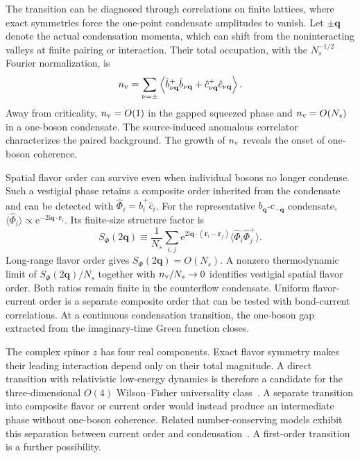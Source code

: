 \documentclass[onecolumn,aps,prb,amsmath,amssymb,superscriptaddress,longbibliography]{revtex4-2}
\newcommand{\ee}{\mathrm{e}}
\newcommand{\ii}{\mathrm{i}}
\begin{document}
The transition can be diagnosed through correlations on finite lattices, where exact symmetries force the one-point condensate amplitudes to vanish.  Let \(\pm\mathbf q\) denote the actual condensation momenta, which can shift from the noninteracting valleys at finite pairing or interaction.  Their total occupation, with the \(N_s^{-1/2}\) Fourier normalization, is
\begin{equation}
    n_{\rm v}=\sum_{\nu=\pm}\left\langle
    \hat b_{\nu\mathbf q}^+\hat b_{\nu\mathbf q}
    +\hat c_{\nu\mathbf q}^+\hat c_{\nu\mathbf q}
    \right\rangle.
    \label{eq:three_plus_condensate_scaling}
\end{equation}
Away from criticality, \(n_{\rm v}=O(1)\) in the gapped squeezed phase and \(n_{\rm v}=O(N_s)\) in a one-boson condensate.  The source-induced anomalous correlator characterizes the paired background.  The growth of \(n_{\rm v}\) reveals the onset of one-boson coherence.

Spatial flavor order can survive even when individual bosons no longer condense.  Such a vestigial phase retains a composite order inherited from the condensate and can be detected with \(\hat\Phi_i=\hat b_i^+\hat c_i\).  For the representative \(b_{\mathbf q}\)-\(c_{-\mathbf q}\) condensate, \(\langle\hat\Phi_i\rangle\propto\ee^{-2\ii\mathbf q\cdot\mathbf r_i}\).  Its finite-size structure factor is
\begin{equation}
    S_\Phi(2\mathbf q)\equiv\frac{1}{N_s}\sum_{i,j}
    \ee^{2\ii\mathbf q\cdot(\mathbf r_i-\mathbf r_j)}
    \langle\hat\Phi_i\hat\Phi_j^+\rangle.
    \label{eq:three_plus_counterflow_structure_factor}
\end{equation}
Long-range flavor order gives \(S_\Phi(2\mathbf q)=O(N_s)\).  A nonzero thermodynamic limit of \(S_\Phi(2\mathbf q)/N_s\) together with \(n_{\rm v}/N_s\to0\) identifies vestigial spatial flavor order.  Both ratios remain finite in the counterflow condensate.  Uniform flavor-current order is a separate composite order that can be tested with bond-current correlations.  At a continuous condensation transition, the one-boson gap extracted from the imaginary-time Green function closes.

The complex spinor \(z\) has four real components.  Exact flavor symmetry makes their leading interaction depend only on their total magnitude.  A direct transition with relativistic low-energy dynamics is therefore a candidate for the three-dimensional \(O(4)\) Wilson--Fisher universality class~\cite{pelissettoVicari2002critical}.  A separate transition into composite flavor or current order would instead produce an intermediate phase without one-boson coherence.  Related number-conserving models exhibit this separation between current order and condensation~\cite{dhar2013,zaletel2014prb}.  A first-order transition is a further possibility.
\end{document}
